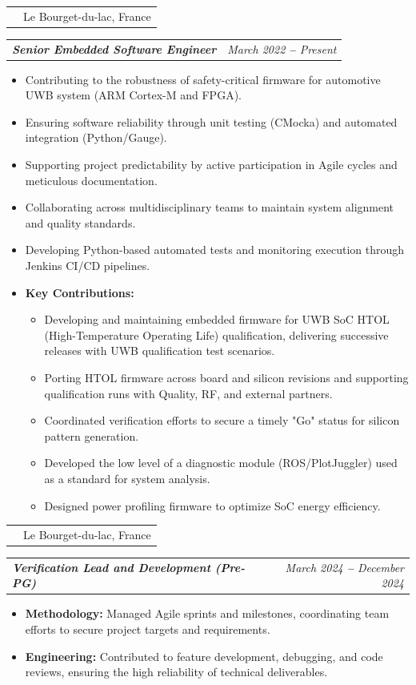 \documentclass[letterpaper,11pt]{article}
\makeatletter
\def\vspaceAfterBullets{1pt} %
\def\bulletIndent{15pt} %
\newcommand{\bulletItem}[1]{
  \item\small{
    {#1}
  }
}
\newcommand{\companyNameAndLocationHeading}[2]{
  \item
    \begin{tabular*}{1.0\textwidth}[b]{l@{\extracolsep{\fill}}r}
      \textbf{#1} & #2
    \end{tabular*}
}
\newcommand{\titleAndDateHeading}[2]{
    \item
    \begin{tabular*}{1.0\textwidth}[b]{l@{\extracolsep{\fill}}r}
      {\bfseries\itshape\small #1} & \itshape\small #2
    \end{tabular*}
}
\newcommand{\outerBulletListStart}{\begin{itemize}[leftmargin=\bulletIndent]}
\newcommand{\outerBulletListEnd}{\end{itemize}\vspace{\vspaceAfterBullets}}
\newcommand{\bref}[2]{\href{#1}{\color{blue}{#2}}}
\makeatother
\begin{document}
\companyNameAndLocationHeading {\bref{https://www.st.com/}{STMicroelectronics}}{Le Bourget-du-lac, France}
\titleAndDateHeading
{Senior Embedded Software Engineer}{March 2022 \textbf{--} Present}
\outerBulletListStart
\bulletItem{Contributing to the robustness of safety-critical firmware for automotive UWB system (ARM Cortex-M and FPGA).}
\bulletItem{Ensuring software reliability through unit testing (CMocka) and automated integration (Python/Gauge).}
\bulletItem{Supporting project predictability by active participation in Agile cycles and meticulous documentation.}
\bulletItem{Collaborating across multidisciplinary teams to maintain system alignment and quality standards.}
\bulletItem{Developing Python-based automated tests and monitoring execution through Jenkins CI/CD pipelines.}
\bulletItem{\textbf{Key Contributions:}}
\begin{itemize}
  \item Developing and maintaining embedded firmware for UWB SoC HTOL (High-Temperature Operating Life) qualification, delivering successive releases with UWB qualification test scenarios.
  \item Porting HTOL firmware across board and silicon revisions and supporting qualification runs with Quality, RF, and external partners.
  \item Coordinated verification efforts to secure a timely "Go" status for silicon pattern generation.
  \item Developed the low level of a diagnostic module (ROS/PlotJuggler) used as a standard for system analysis.
  \item Designed power profiling firmware to optimize SoC energy efficiency.
\end{itemize}
\outerBulletListEnd
\vspace{1em} %

\companyNameAndLocationHeading {\bref{https://www.st.com/}{STMicroelectronics}}{Le Bourget-du-lac, France}
\titleAndDateHeading
{Verification Lead and Development (Pre-PG)}{March 2024 \textbf{--} December 2024}
\outerBulletListStart
    \bulletItem{\textbf{Methodology:} Managed Agile sprints and milestones, coordinating team efforts to secure project targets and requirements.}
    \bulletItem{\textbf{Engineering:} Contributed to feature development, debugging, and code reviews, ensuring the high reliability of technical deliverables.}
\outerBulletListEnd
\end{document}
